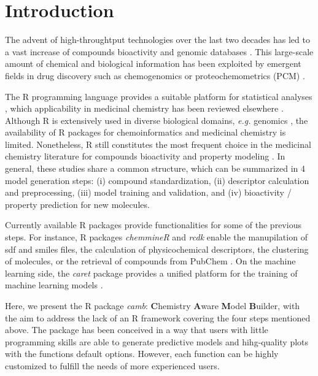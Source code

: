 \documentclass{bioinfo}
\begin{document}
\section{Introduction}

The advent of high-throughtput technologies over the last two decades 
has led to a vast increase of compounds bioactivity
and genomic databases \citep{bender_databases}.
This large-scale amount of chemical and biological information 
has been exploited by emergent fields in drug discovery 
such as chemogenomics or proteochemometrics (PCM) \citep{review_pcm,cortesReview}.

The R programming language provides a suitable platform for statistical analyses \citep{Rlanguage},
which applicability in medicinal chemistry has been reviewed elsewhere \citep{mente}.
Although R is extensively used in diverse biological domains, {\it e.g.} genomics \citep{bioconductor},
the availability of R packages for chemoinformatics and medicinal chemistry is limited. %
Nonetheless, R still constitutes the most frequent choice in the medicinal chemistry literature
for compounds bioactivity and property modeling \citep{mente}.
In general, these studies share a common structure, which can be summarized in 4 model generation steps:
(i) compound standardization, (ii) descriptor calculation and preprocessing,
(iii) model training and validation, and (iv) bioactivity / property prediction for new molecules.

Currently available R packages provide functionalities for some of the previous steps.
For instance, R packages {\it chemmineR} \citep{chemmineR} and {\it rcdk} \citep{rcdk} enable the manupilation of sdf and smiles
files, the calculation of physicochemical descriptors, the clustering of molecules,
or the retrieval of compounds from PubChem \citep{pubchem}.
On the machine learning side, the {\it caret} package provides a
unified platform for the training of machine learning models \citep{caret}.

Here, we present the R package {\it camb}: {\bf C}hemistry {\bf A}ware {\bf M}odel {\bf B}uilder,
with the aim to address the lack of an R framework covering the four steps mentioned above.
The package has been conceived in a way that users with little
programming skills are able to generate predictive models and hihg-quality plots
with the functions default options.
However, each function can be highly customized to fulfill the needs of more experienced users.
\end{document}
